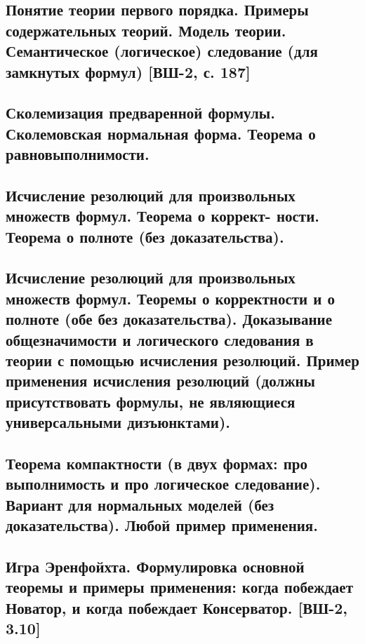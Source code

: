 \documentclass[a4paper, fleqn]{article}
\begin{document}
    \subsection{Понятие теории первого порядка. Примеры содержательных теорий. Модель теории. Семантическое (логическое) следование (для замкнутых формул) [ВШ-2, с. 187]}

    \subsection{Сколемизация предваренной формулы. Сколемовская нормальная форма. Теорема о равновыполнимости.}

    \subsection{Исчисление резолюций для произвольных множеств формул. Теорема о коррект- ности.
        Теорема о полноте (без доказательства).}

    \subsection{Исчисление резолюций для произвольных множеств формул. Теоремы о корректности и о полноте (обе без доказательства). Доказывание общезначимости и логического следования в теории с помощью исчисления резолюций. Пример применения исчисления резолюций (должны присутствовать формулы, не являющиеся универсальными дизъюнктами).}

    \subsection{Теорема компактности (в двух формах: про выполнимость и про логическое следование). Вариант для нормальных моделей (без доказательства). Любой пример применения.}

    \subsection{Игра Эренфойхта. Формулировка основной теоремы и примеры применения: когда побеждает Новатор, и когда побеждает Консерватор. [ВШ-2, 3.10]}
\end{document}
